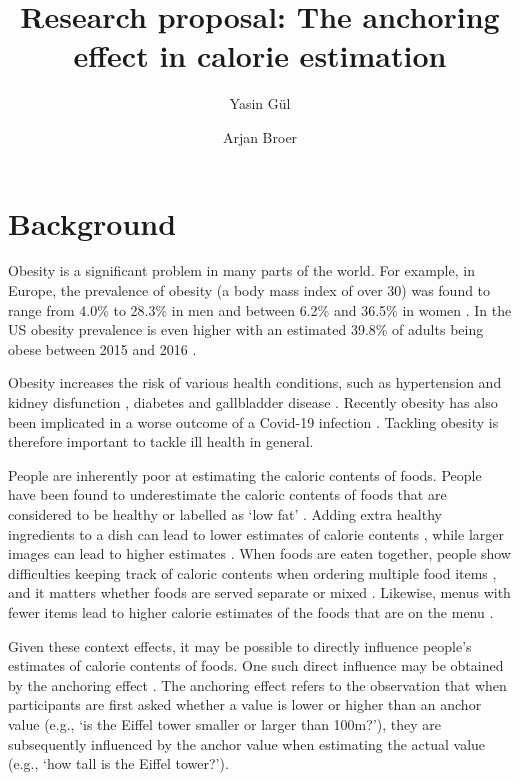 \documentclass[a4paper,doc,natbib]{apa6}
\title{Research proposal: The anchoring effect in calorie estimation}
\author{Yasin G\"{u}l \and Arjan Broer}
\affiliation{Open University of the Netherlands}
\begin{document}
\maketitle

\section{Background}

Obesity is a significant problem in many parts of the world. For example, in Europe, the prevalence of obesity (a body mass index of over 30) was found to range from 4.0\% to 28.3\% in men and between 6.2\% and 36.5\% in women \citep{berghofer2008obesity}. In the US obesity prevalence is even higher with an estimated 39.8\% of adults being obese between 2015 and 2016 \citep{hales2017prevalence}. 

Obesity increases the risk of various health conditions, such as hypertension and kidney disfunction \citep{hall2019obesity}, diabetes \citep{schnurr2020obesity} and gallbladder disease \citep{zahra2019link}. Recently obesity has also been implicated in a worse outcome of a Covid-19 infection \citep{hussain2020obesity}. Tackling obesity is therefore important to tackle ill health in general.

People are inherently poor at estimating the caloric contents of foods. People have been found to underestimate the caloric contents of foods that are considered to be healthy \citep{chandon2007biasing} or labelled as `low fat' \citep{ebneter2013less}. Adding extra healthy ingredients to a dish can lead to lower estimates of calorie contents \citep{zhu2019extra}, while larger images can lead to higher estimates \citep{tal2021visual}. When foods are eaten together, people show difficulties keeping track of caloric contents when ordering multiple food items \citep{gustafson2019cognitive}, and it matters whether foods are served separate or mixed \citep{ai2021serving}. Likewise, menus with fewer items lead to higher calorie estimates of the foods that are on the menu \citep{kim2022impact}.

Given these context effects, it may be possible to directly influence people's estimates of calorie contents of foods. One such direct influence may be obtained by the anchoring effect \citep{furnham2011literature,tversky1974judgment}. The anchoring effect refers to the observation that when participants are first asked whether a value is lower or higher than an anchor value (e.g., `is the Eiffel tower smaller or larger than 100m?'), they are subsequently influenced by the anchor value when estimating the actual value (e.g., `how tall is the Eiffel tower?').
\end{document}
